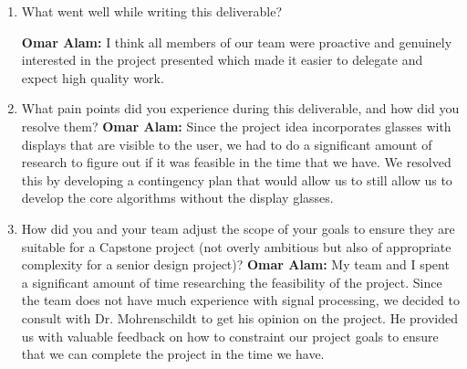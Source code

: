 \documentclass{article}
\begin{document}
\begin{enumerate}
    \item What went well while writing this deliverable? 
    
    \textbf{Omar Alam:} I think all members of our team were proactive and genuinely interested in the project presented which made it easier
    to delegate and expect high quality work. 
    \item What pain points did you experience during this deliverable, and how
    did you resolve them?
    \textbf{Omar Alam:} Since the project idea incorporates glasses with displays that are visible to the user, we had to do a significant amount
    of research to figure out if it was feasible in the time that we have. We resolved this by developing a contingency plan that would allow us to 
    still allow us to develop the core algorithms without the display glasses.
    \item How did you and your team adjust the scope of your goals to ensure
    they are suitable for a Capstone project (not overly ambitious but also of
    appropriate complexity for a senior design project)?
    \textbf{Omar Alam:} My team and I spent a significant amount of time researching the feasibility of the project. Since the team does not have much
    experience with signal processing, we decided to consult with Dr. Mohrenschildt to get his opinion on the project. He provided us with valuable feedback on how
    to constraint our project goals to ensure that we can complete the project in the time we have.
\end{enumerate}  
\end{document}
